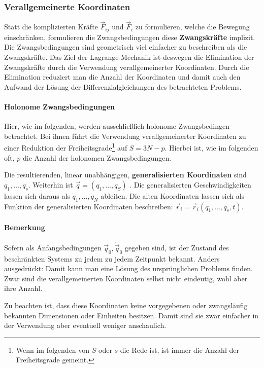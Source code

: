\documentclass[oneside]{book}
\theoremstyle{definition}
\newcommand{\dotvec}[1]{\dot{\vec{#1}}}
\begin{document}
\subsubsection{Verallgemeinerte Koordinaten}
Statt die komplizierten Kräfte $\vec{F}_{ij}$ und $\vec{F}_i$ zu formulieren, welche die Bewegung einschränken, formulieren die Zwangsbedingungen diese \textbf{Zwangskräfte} implizit.
Die Zwangsbedingungen sind geometrisch viel einfacher zu beschreiben als die Zwangskräfte. Das Ziel der Lagrange-Mechanik ist deswegen die Elimination der Zwangskräfte durch die Verwendung verallgemeinerter Koordinaten. Durch die Elimination reduziert man die Anzahl der Koordinaten und damit auch den Aufwand der Lösung der Differenzialgleichungen des betrachteten Problems.

\paragraph{Holonome Zwangsbedingungen}
Hier, wie im folgenden, werden ausschließlich holonome Zwangsbedingen betrachtet. Bei ihnen führt die Verwendung verallgemeinerter Koordinaten zu einer Reduktion der Freiheitsgrade\footnote{Wenn im folgenden von $S$ oder $s$ die Rede ist, ist immer die Anzahl der Freiheitsgrade gemeint.} auf $S = 3N - p$. Hierbei ist, wie im folgenden oft, $p$ die Anzahl der holonomen Zwangsbedingungen. 

Die resultierenden, linear unabhängigen, \textbf{generalisierten Koordinaten} sind $q_1, \dots, q_s$. Weiterhin ist $\vec{q} = (q_1, \dots, q_S)$
. Die generalisierten Geschwindigkeiten lassen sich daraus als $\dot{q}_1, \dots, \dot{q}_N$ ableiten. Die alten Koordinaten lassen sich als Funktion der generalisierten Koordinaten beschreiben: $\vec{r}_i = \vec{r}_i(q_1, \dots, q_s, t)$.

\paragraph{Bemerkung}
Sofern als Anfangsbedingungen $\vec{q}_0, \dotvec{q}_0$ gegeben sind, ist der Zustand des beschränkten Systems zu jedem zu jedem Zeitpunkt bekannt. Anders ausgedrückt: Damit kann man eine Lösung des ursprünglichen Problems finden. Zwar sind die verallgemeinerten Koordinaten selbst nicht eindeutig, wohl aber ihre Anzahl.

Zu beachten ist, dass diese Koordinaten keine vorgegebenen oder zwangsläufig bekannten Dimensionen oder Einheiten besitzen. Damit sind sie zwar einfacher in der Verwendung aber eventuell weniger anschaulich.
\end{document}
